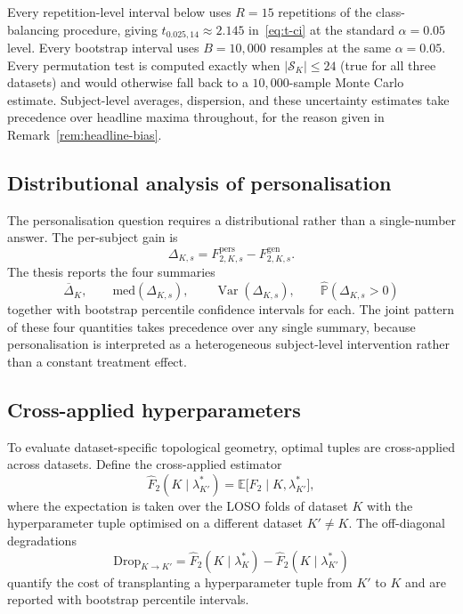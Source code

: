 \documentclass[onluarkali,ingilizce,yukseklisans,karton,LisansustuEgitim]{itutez}
\DeclareMathOperator{\Var}{Var}
\providecommand{\E}{\mathbb{E}}
\providecommand{\Prob}{\mathbb{P}}
\providecommand{\1}{\mathbf{1}}
\providecommand{\Sset}{\mathcal{S}}
\begin{document}
Every repetition-level interval below uses $R=15$ repetitions of the class-balancing procedure, giving $t_{0.025,14}\approx 2.145$ in~\eqref{eq:t-ci} at the standard $\alpha=0.05$ level. Every bootstrap interval uses $B=10{,}000$ resamples at the same $\alpha=0.05$. Every permutation test is computed exactly when $|\Sset_K|\leq 24$ (true for all three datasets) and would otherwise fall back to a $10{,}000$-sample Monte Carlo estimate. Subject-level averages, dispersion, and these uncertainty estimates take precedence over headline maxima throughout, for the reason given in Remark~\ref{rem:headline-bias}.

\subsection{Distributional analysis of personalisation}
\label{subsubsec:dist-pers}

The personalisation question requires a distributional rather than a single-number answer. The per-subject gain is
\[
  \Delta_{K,s}=F_{2,K,s}^{\mathrm{pers}}-F_{2,K,s}^{\mathrm{gen}}.
\]
The thesis reports the four summaries
\[
  \overline{\Delta}_K,
  \qquad
  \mathrm{med}(\Delta_{K,s}),
  \qquad
  \Var(\Delta_{K,s}),
  \qquad
  \widehat{\Prob}(\Delta_{K,s}>0)
\]
together with bootstrap percentile confidence intervals for each. The joint pattern of these four quantities takes precedence over any single summary, because personalisation is interpreted as a heterogeneous subject-level intervention rather than a constant treatment effect.

\subsection{Cross-applied hyperparameters}
\label{subsubsec:cross-applied}

To evaluate dataset-specific topological geometry, optimal tuples are cross-applied across datasets. Define the cross-applied estimator
\[
  \widehat F_2(K\mid\lambda^*_{K'})=\E\bigl[F_2\mid K,\lambda^*_{K'}\bigr],
\]
where the expectation is taken over the LOSO folds of dataset $K$ with the hyperparameter tuple optimised on a different dataset $K'\neq K$. The off-diagonal degradations
\[
  \mathrm{Drop}_{K\to K'}=\widehat F_2(K\mid\lambda^*_K)-\widehat F_2(K\mid\lambda^*_{K'})
\]
quantify the cost of transplanting a hyperparameter tuple from $K'$ to $K$ and are reported with bootstrap percentile intervals.

\end{document}
